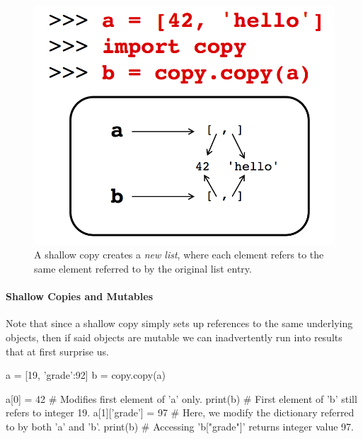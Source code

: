 \documentclass[12pt,letterpaper,twoside]{article}
\begin{document}
\begin{enumerate}
\begin{figure}[h]
\centering
\includegraphics[scale=0.35]{fig/shallow-copy.png}
\caption{\small A shallow copy creates a \emph{new list}, where each element refers to the same
  element referred to by the original list entry.}
\end{figure}

\paragraph{Shallow Copies and Mutables} Note that since a shallow copy simply sets up references
to the same underlying objects, then if said objects are mutable we can inadvertently run into
results that at first surprise us.
\begin{python}
a = [19, {'grade':92}]
b = copy.copy(a)

a[0] = 42             # Modifies first element of 'a' only.
print(b)              # First element of 'b' still refers to integer 19.
a[1]['grade'] = 97    # Here, we modify the dictionary referred to by both 'a' and 'b'.
print(b)              # Accessing 'b["grade"]' returns integer value 97.
\end{python}


\end{enumerate}
\end{document}
